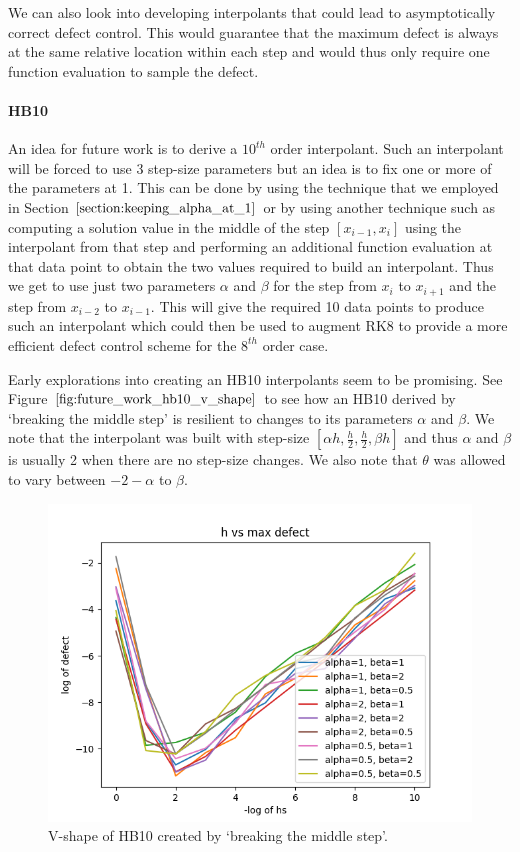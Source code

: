 We can also look into developing interpolants that could lead to asymptotically  correct defect control. 
This would guarantee that the maximum defect is always at the same relative location within each step and would thus only require one function evaluation to sample the defect.

\paragraph{HB10}
An idea for future work is to derive a $10^{th}$ order interpolant. Such an interpolant will be forced to use 3 step-size parameters but an idea is to fix one or more of the parameters at 1. This can be done by using the technique that we employed in Section $\ref{section:keeping_alpha_at_1}$ or by using another technique such as computing a solution value in the middle of the step $[x_{i-1}, x_i]$ using the interpolant from that step and performing an additional function evaluation at that data point to obtain the two values required to build an interpolant. Thus we get to use just two parameters $\alpha$ and $\beta$ for the step from $x_i$ to $x_{i+1}$ and the step from $x_{i-2}$ to $x_{i-1}$.  This will give the required 10 data points to produce such an interpolant which could then be used to augment RK8 to provide a more efficient defect control scheme for the $8^{th}$ order case. 

Early explorations into creating an HB10 interpolants seem to be promising. See Figure $\ref{fig:future_work_hb10_v_shape}$ to see how an HB10 derived by `breaking the middle step' is resilient to changes to its parameters $\alpha$ and $\beta$. We note that the interpolant was built with step-size $[\alpha h, \frac{h}{2}, \frac{h}{2}, \beta h]$ and thus $\alpha$ and $\beta$ is usually 2 when there are no step-size changes. We also note that $\theta$ was allowed to vary between $-2-\alpha$ to $\beta$.

\begin{figure}[H]
\centering
\includegraphics[width=0.7\linewidth]{./figures/future_work_hb10_v_shape}
\caption{V-shape of HB10 created by `breaking the middle step'.}
\label{fig:future_work_hb10_v_shape}
\end{figure}

